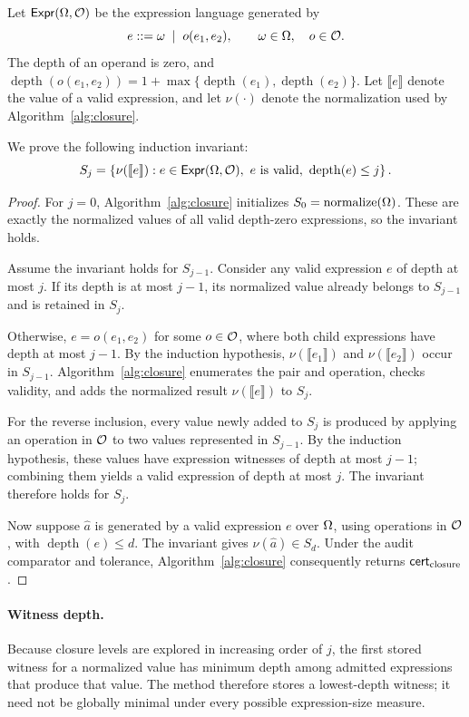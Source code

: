 Let $\mathsf{Expr}(\Omega,\mathcal{O})$ be the expression language
generated by
\[
e ::= \omega
\;\mid\;
o(e_1,e_2),
\qquad
\omega\in\Omega,\quad o\in\mathcal{O}.
\]
The depth of an operand is zero, and
$\operatorname{depth}(o(e_1,e_2))
=1+\max\{\operatorname{depth}(e_1),
\operatorname{depth}(e_2)\}$. Let
$\llbracket e\rrbracket$ denote the value of a valid expression,
and let $\nu(\cdot)$ denote the normalization used by
Algorithm~\ref{alg:closure}.

We prove the following induction invariant:
\[
S_j
=
\left\{
\nu(\llbracket e\rrbracket):
e\in\mathsf{Expr}(\Omega,\mathcal{O}),\
e\text{ is valid},\
\operatorname{depth}(e)\le j
\right\}.
\]

\begin{proof}
For $j=0$, Algorithm~\ref{alg:closure} initializes
$S_0=\operatorname{normalize}(\Omega)$. These are exactly the
normalized values of all valid depth-zero expressions, so the
invariant holds.

Assume the invariant holds for $S_{j-1}$. Consider any valid
expression $e$ of depth at most $j$. If its depth is at most
$j-1$, its normalized value already belongs to $S_{j-1}$ and is
retained in $S_j$.

Otherwise, $e=o(e_1,e_2)$ for some $o\in\mathcal{O}$, where both child
expressions have depth at most $j-1$. By the induction hypothesis,
$\nu(\llbracket e_1\rrbracket)$ and
$\nu(\llbracket e_2\rrbracket)$ occur in $S_{j-1}$.
Algorithm~\ref{alg:closure} enumerates the pair and operation,
checks validity, and adds the normalized result
$\nu(\llbracket e\rrbracket)$ to $S_j$.

For the reverse inclusion, every value newly added to $S_j$ is
produced by applying an operation in $\mathcal{O}$ to two values
represented in $S_{j-1}$. By the induction hypothesis, these
values have expression witnesses of depth at most $j-1$; combining
them yields a valid expression of depth at most $j$. The invariant
therefore holds for $S_j$.

Now suppose $\hat a$ is generated by a valid expression $e$ over
$\Omega$, using operations in $\mathcal{O}$, with
$\operatorname{depth}(e)\le d$. The invariant gives
$\nu(\hat a)\in S_d$. Under the audit comparator and tolerance,
Algorithm~\ref{alg:closure} consequently returns
$\mathsf{cert}_{\mathrm{closure}}$.
\end{proof}

\paragraph{Witness depth.}
Because closure levels are explored in increasing order of $j$,
the first stored witness for a normalized value has minimum depth
among admitted expressions that produce that value. The method
therefore stores a lowest-depth witness; it need not be globally
minimal under every possible expression-size measure.

